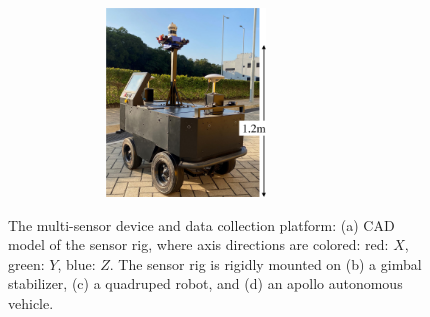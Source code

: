 \begin{figure}[!ht]
\begin{subfigure}{0.4\textwidth}
    \centering
    \includegraphics[width=0.8\textwidth, height=5cm]{figure/pqe/methodology/apollo-crop.pdf}
    \caption{}
\end{subfigure}

\caption{The multi-sensor device and data collection platform: 
(a) CAD model of the sensor rig, where axis directions are colored: red: $X$, green: $Y$, blue: $Z$. The sensor rig is rigidly mounted on (b) a gimbal stabilizer, (c) a quadruped robot, and (d) an apollo autonomous vehicle.}
\label{fig:FusionPortable}
\end{figure}
 
 








